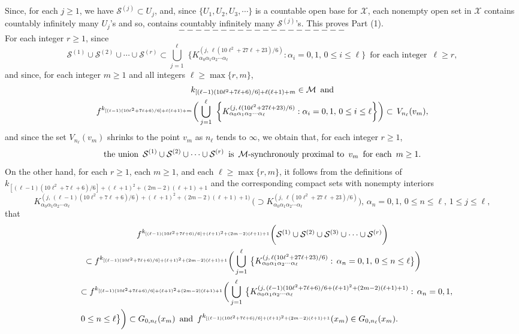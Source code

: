 \documentclass[12pt]{article}
\newcommand{\al}{\alpha}
\begin{document}
Since, for each $j \ge 1$, we have $\mathcal S^{(j)} \subset U_j$, and, since $\{ U_1, U_2, U_3, \cdots \}$ is a countable open base for $\mathcal X$, each nonempty open set in $\mathcal X$ contains countably infinitely many $U_j$'s and so, contains countably infinitely many $\mathcal S^{(j)}$'s.  This proves Part (1).  
$$--------------------$$
\indent For each integer $r \ge 1$, since 
$$
\mathcal S^{(1)} \cup \mathcal S^{(2)} \cup \cdots \cup \mathcal S^{(r)} \subset \bigcup_{j=1}^\ell \,\, \bigg\{ K_{\al_0\al_1\al_2\cdots\al_\ell}^{(j, \, \ell(10\ell^2+27\ell+23)/6)}: \al_i = 0, 1, \, 0 \le i \le \ell \bigg\} \,\,\, \text{for each integer} \,\,\, \ell \ge r,
$$
and since, for each integer $m \ge 1$ and all integers $\ell \ge \max \{ r, m \}$,   
\begin{multline*}
$$
k_{[(\ell-1)(10\ell^2+7\ell+6)/6]+\ell(\ell+1)+m} \in \mathcal M \,\,\, \text{and} \\
f^{k_{[(\ell-1)(10\ell^2+7\ell+6)/6]+\ell(\ell+1)+m}}\bigg(\bigcup_{j=1}^\ell \,\, \bigg\{K_{\al_0\al_1\al_2\cdots\al_\ell}^{(j, \, \ell(10\ell^2+27\ell+23)/6)}: \al_i = 0, 1, \, 0 \le i \le \ell \bigg\}\bigg) \subset \, V_{n_\ell}(v_m),
$$
\end{multline*}
and since the set $V_{n_\ell}(v_m)$ shrinks to the point $v_m$ as $n_\ell$ tends to $\infty$, we obtain that, for each integer $r \ge 1$, 
$$
\text{the union} \,\,\, \mathcal S^{(1)} \cup \mathcal S^{(2)} \cup \cdots \cup \mathcal S^{(r)} \,\,\, \text{is} \,\,\, \mathcal M\text{-synchronouly proximal to} \,\,\, v_m \,\,\, \text{for each} \,\,\, m \ge 1. \vspace{.1in}
$$
\indent On the other hand, for each $r \ge 1$, each $m \ge 1$, and each $\ell \ge \max \{ r, m \}$, it follows from the definitions of 
$k_{[(\ell-1)(10\ell^2+7\ell+6)/6]+(\ell+1)^2+(2m-2)(\ell+1)+1}$ and the corresponding compact sets with nonempty interiors 
$$
K_{\al_0\al_1\al_2\cdots\al_\ell}^{(j, \, (\ell-1)(10\ell^2+7\ell+6)/6)+(\ell+1)^2+(2m-2)(\ell+1)+1)} \, \big(\supset K_{\al_0\al_1\al_2\cdots\al_\ell}^{(j, \, \ell(10\ell^2+27\ell+23)/6)}\big), \, \al_n = 0, 1, \, 0 \le n \le \ell, \, 1 \le j \le \ell, 
$$
that
\begin{multline*}
$$
f^{k_{[(\ell-1)(10\ell^2+7\ell+6)/6]+(\ell+1)^2+(2m-2)(\ell+1)+1}}\bigg(\mathcal S^{(1)} \cup \mathcal S^{(2)} \cup \mathcal S^{(3)} \cup \cdots \cup \mathcal S^{(r)}\bigg) \\
\subset f^{k_{[(\ell-1)(10\ell^2+7\ell+6)/6]+(\ell+1)^2+(2m-2)(\ell+1)+1}}\bigg(\bigcup_{j=1}^\ell \, \big\{ K_{\al_0\al_1\al_2\cdots\al_\ell}^{(j, \, \ell(10\ell^2+27\ell+23)/6)}: \, \al_n = 0, 1, \, 0 \le n \le \ell \big\}\bigg) \qquad\, \\ 
\,\,\,\,\,\, \subset f^{k_{[(\ell-1)(10\ell^2+7\ell+6)/6]+(\ell+1)^2+(2m-2)(\ell+1)+1}}\bigg(\bigcup_{j=1}^\ell \, \big\{ K_{\al_0\al_1\al_2\cdots\al_\ell}^{(j, \, (\ell-1)(10\ell^2+7\ell+6)/6+(\ell+1)^2+(2m-2)(\ell+1)+1)}: \, \al_n = 0, 1, \\
\, 0 \le n \le \ell \big\}\bigg) \subset G_{0,n_\ell}(x_m) \,\,\, \text{and} \,\,\, f^{k_{[(\ell-1)(10\ell^2+7\ell+6)/6]+(\ell+1)^2+(2m-2)(\ell+1)+1}}(x_m) \in G_{0,n_\ell}(x_m). \qquad\qquad\quad\,\,\,\,
$$
\end{multline*}
\end{document}
